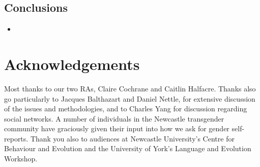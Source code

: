 \documentclass[a0,portrait]{a0poster}
\begin{document}
\begin{multicols}{2}

\color{SaddleBrown} %

\section*{Conclusions}

\begin{itemize}
\item 
\end{itemize}

\color{DarkSlateGray} %


\end{multicols}


\section*{Acknowledgements}

Most thanks to our two RAs, Claire Cochrane and Caitlin Halfacre. Thanks also go particularly to Jacques Balthazart and Daniel Nettle, for extensive discussion of the issues and methodologies, and to Charles Yang for discussion regarding social networks. A number of individuals in the Newcastle transgender community have graciously given their input into how we ask for gender self-reports. Thank you also to audiences at Newcastle University's Centre for Behaviour and Evolution and the University of York's Language and Evolution Workshop.

\end{document}
